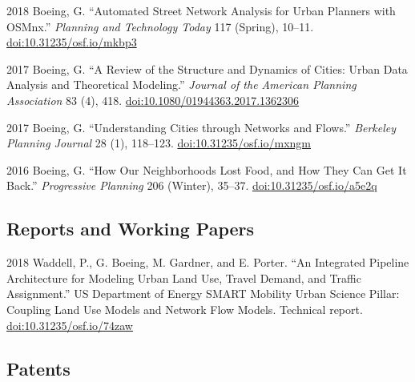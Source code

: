 \documentclass[12pt,letterpaper]{report}
\begin{document}
	\begin{tablist}

		\item[2018] \tab Boeing, G. \enquote{Automated Street Network Analysis for Urban Planners with OSMnx.} \textit{Planning and Technology Today} 117 (Spring), 10--11. \href{https://doi.org/10.31235/osf.io/mkbp3}{doi:10.31235/osf.io/mkbp3}

		\item[2017] \tab Boeing, G. \enquote{A Review of the Structure and Dynamics of Cities: Urban Data Analysis and Theoretical Modeling.} \textit{Journal of the American Planning Association} 83 (4), 418. \href{https://doi.org/10.1080/01944363.2017.1362306}{doi:10.1080/01944363.2017.1362306}

		\item[2017] \tab Boeing, G. \enquote{Understanding Cities through Networks and Flows.} \textit{Berkeley Planning Journal} 28 (1), 118--123. \href{https://doi.org/10.31235/osf.io/mxngm}{doi:10.31235/osf.io/mxngm}

		\item[2016] \tab Boeing, G. \enquote{How Our Neighborhoods Lost Food, and How They Can Get It Back.} \textit{Progressive Planning} 206 (Winter), 35--37. \href{https://doi.org/10.31235/osf.io/a5e2q}{doi:10.31235/osf.io/a5e2q}

	\end{tablist}



	\subsection*{Reports and Working Papers}

	\begin{tablist}

		\item[2018] \tab Waddell, P., G. Boeing, M. Gardner, and E. Porter. \enquote{An Integrated Pipeline Architecture for Modeling Urban Land Use, Travel Demand, and Traffic Assignment.} US Department of Energy SMART Mobility Urban Science Pillar: Coupling Land Use Models and Network Flow Models. Technical report. \href{https://doi.org/10.31235/osf.io/74zaw}{doi:10.31235/osf.io/74zaw}

	\end{tablist}



	\subsection*{Patents}
\end{document}
